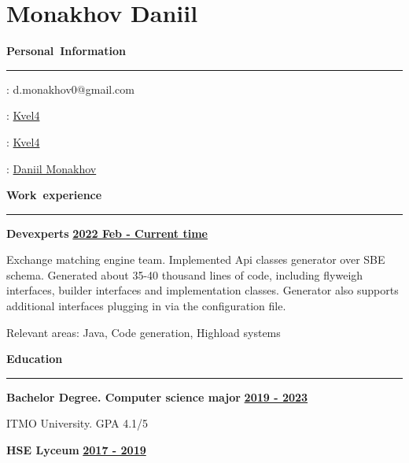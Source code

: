 \documentclass[11pt,a4paper]{report}
\author{Monakhov Daniil}
\begin{document}
\section*{\huge{Monakhov Daniil}}

\par\hbox{\Large\textbf{Personal Information}}\kern3pt\hrule
\begin{multicols}{2}

\hspace{5px}
\Letter: d.monakhov0@gmail.com




\hspace{5px}
\faGithub:  \href{https://github.com/Kvel4}{Kvel4}

\faSend:  \href{https://t.me/Kvel4}{Kvel4}


\faLinkedin:  \href{https://www.linkedin.com/in/daniil-monakhov-9b8b3422b/}{Daniil Monakhov}

\end{multicols}

\par\hbox{\Large\textbf{Work experience}}\kern5pt\hrule\kern10pt
\textbf{Devexperts}
\hfill
\textbf{\underline{2022 Feb - Current time}}

\vspace{5px}
\hspace{10px}
Exchange matching engine team. Implemented Api classes generator over SBE schema. Generated about 35-40 thousand lines of code, including flyweigh interfaces, builder interfaces and implementation classes. Generator also supports additional interfaces plugging in via the configuration file.
\hfill

\vspace{5px}
\hspace{10px}
Relevant areas: Java, Code generation, Highload systems


\vspace{12px}


\par\hbox{\Large\textbf{Education}}\kern5pt\hrule\kern10pt

\textbf{Bachelor Degree. Computer science major}
\hfill
\textbf{\underline{2019 - 2023}}

\vspace{5px}
\hspace{10px}
ITMO University. GPA 4.1/5   \\
\hfill

\textbf{HSE Lyceum}
\hfill
\textbf{\underline{2017 - 2019}}
\end{document}

